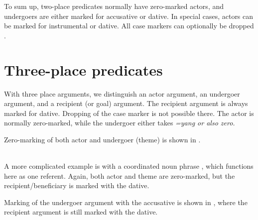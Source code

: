 To sum up, two-place predicates normally have zero-marked actors, and undergoers are either marked for accusative or dative. In special cases, actors can be marked for instrumental or dative. All case markers can optionally be dropped \citep{Ansaldo2005ms, Ansaldo2008genesis, Ansaldo2009book}.



\section{Three-place predicates}\label{sec:argstr:Three-placepredicates}
With three place arguments, we distinguish an actor argument, an undergoer argument, and a recipient (or goal) argument. The recipient argument is always marked for dative. Dropping of the case marker is not possible there. The actor is normally zero-marked, while the undergoer either takes \em =yang \em or also zero.

Zero-marking of both actor and undergoer (theme) is shown in .

\\

A more complicated example is 
 with a coordinated noun phrase , which functions here as one referent. Again, both actor and theme are zero-marked, but the recipient/beneficiary is marked with the dative.



Marking of the undergoer argument with the accusative is shown in  , where the recipient argument is still marked with the dative.


